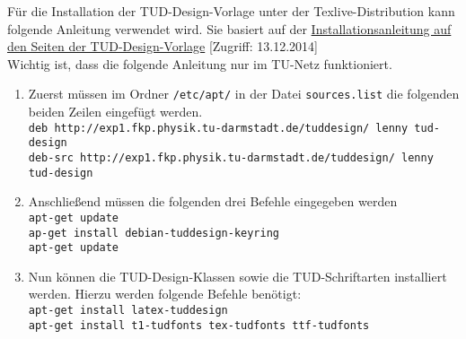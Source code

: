 Für die Installation der TUD-Design-Vorlage unter der Texlive-Distribution kann folgende Anleitung verwendet wird. Sie basiert auf der \href{http://exp1.fkp.physik.tu-darmstadt.de/tuddesign/debian.html}{Installationsanleitung auf den Seiten der TUD-Design-Vorlage} [Zugriff: 13.12.2014]\\
Wichtig ist, dass die folgende Anleitung nur im TU-Netz funktioniert.
\begin{enumerate}
	\item Zuerst müssen im Ordner \verb|/etc/apt/| in der Datei \verb|sources.list| die folgenden beiden Zeilen eingefügt werden.\\
		\verb|deb http://exp1.fkp.physik.tu-darmstadt.de/tuddesign/ lenny tud-design|\\
		\verb|deb-src http://exp1.fkp.physik.tu-darmstadt.de/tuddesign/ lenny tud-design|
	\item Anschließend müssen die folgenden drei Befehle eingegeben werden\\
		\verb|apt-get update|\\
		\verb|ap-get install debian-tuddesign-keyring|\\
		\verb|apt-get update|
	\item Nun können die TUD-Design-Klassen sowie die TUD-Schriftarten installiert werden. Hierzu werden folgende Befehle benötigt:\\
	\verb|apt-get install latex-tuddesign|\\
	\verb|apt-get install t1-tudfonts tex-tudfonts ttf-tudfonts|
\end{enumerate}